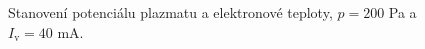 \documentclass[a4paper,12pt]{article}
\begin{document}
\begin{figure}[h]
	\centering
	\begin{subfigure}[b]{.49\textwidth}
		\centering
	\end{subfigure}
	\begin{subfigure}[b]{.49\textwidth}
		\centering
	\end{subfigure}
	\caption{Stanovení potenciálu plazmatu a elektronové teploty, $p = 200$ \si{\pascal} a $I_\text{v} = 40$ \si{\milli\ampere}.}
	\label{data3}
\end{figure}
\end{document}

